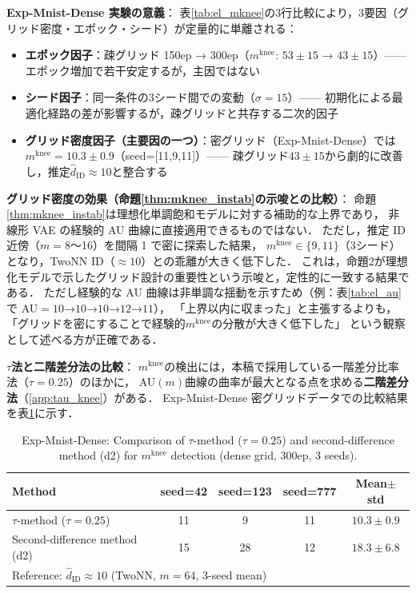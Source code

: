 \documentclass[11pt,a4paper]{jsarticle}
\newcommand{\mknee}{m^{\mathrm{knee}}}
\begin{document}
\textbf{Exp-Mnist-Dense 実験の意義}：
表\ref{tab:el_mknee}の3行比較により，3要因（グリッド密度・エポック・シード）が定量的に単離される：
\begin{itemize}
  \item \textbf{エポック因子}：疎グリッド 150ep → 300ep（$\mknee$: $53\pm15$ → $43\pm15$）—— エポック増加で若干安定するが，主因ではない
  \item \textbf{シード因子}：同一条件の3シード間での変動（$\sigma = 15$）—— 初期化による最適化経路の差が影響するが，疎グリッドと共存する二次的因子
  \item \textbf{グリッド密度因子（主要因の一つ）}：密グリッド（Exp-Mnist-Dense）では$\mknee = 10.3 \pm 0.9$（seed=[11,9,11]）—— 疎グリッド$43\pm15$から劇的に改善し，推定$\hat{d}_\mathrm{ID} \approx 10$と整合する
\end{itemize}

\noindent
\textbf{グリッド密度の効果（命題\ref{thm:mknee_instab}の示唆との比較）}：
命題\ref{thm:mknee_instab}は理想化単調飽和モデルに対する補助的な上界であり，
非線形 VAE の経験的 AU 曲線に直接適用できるものではない．
ただし，推定 ID 近傍（$m = 8$〜16）を間隔 1 で密に探索した結果，
$\mknee \in \{9, 11\}$（3シード）となり，TwoNN ID（$\approx 10$）との乖離が大きく低下した．
これは，命題2が理想化モデルで示したグリッド設計の重要性という示唆と，定性的に一致する結果である．
ただし経験的な AU 曲線は非単調な揺動を示すため（例：表\ref{tab:el_au}で AU$=10$→$10$→$10$→$12$→$11$），
「上界以内に収まった」と主張するよりも，「グリッドを密にすることで経験的$\mknee$の分散が大きく低下した」
という観察として述べる方が正確である．

\noindent
\textbf{$\tau$法と二階差分法の比較}：
$\mknee$の検出には，本稿で採用している一階差分比率法（$\tau = 0.25$）のほかに，
AU$(m)$曲線の曲率が最大となる点を求める\textbf{二階差分法}（\ref{app:tau_knee}）がある．
Exp-Mnist-Dense 密グリッドデータでの比較結果を表\ref{tab:el_knee_compare}に示す．

\begin{table}[H]
\centering
\caption{Exp-Mnist-Dense: Comparison of $\tau$-method ($\tau=0.25$) and second-difference method (d2) for $\mknee$ detection (dense grid, 300ep, 3 seeds).}
\label{tab:el_knee_compare}
\small
\begin{tabular}{lcccc}
\toprule
Method & seed=42 & seed=123 & seed=777 & Mean$\pm$std \\
\midrule
$\tau$-method ($\tau=0.25$) & 11 & 9  & 11 & $10.3 \pm 0.9$ \\
Second-difference method (d2) & 15 & 28 & 12 & $18.3 \pm 6.8$ \\
\midrule
\multicolumn{5}{l}{Reference: $\hat{d}_\mathrm{ID} \approx 10$ (TwoNN, $m=64$, 3-seed mean)} \\
\bottomrule
\end{tabular}
\end{table}
\end{document}
